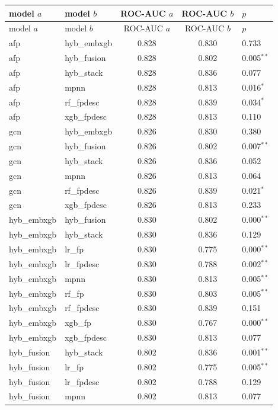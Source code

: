 \documentclass[conference]{IEEEtran}
\begin{document}
\begin{longtable}{llccl}
\toprule
model $a$ & model $b$ & ROC-AUC $a$ & ROC-AUC $b$ & $p$ \\
\midrule
\endfirsthead
\toprule
model $a$ & model $b$ & ROC-AUC $a$ & ROC-AUC $b$ & $p$ \\
\midrule
\endhead
\bottomrule
\endfoot
afp & hyb\_embxgb & 0.828 & 0.830 & 0.733 \\
afp & hyb\_fusion & 0.828 & 0.802 & 0.005$^{**}$ \\
afp & hyb\_stack & 0.828 & 0.836 & 0.077 \\
afp & mpnn & 0.828 & 0.813 & 0.016$^{*}$ \\
afp & rf\_fpdesc & 0.828 & 0.839 & 0.034$^{*}$ \\
afp & xgb\_fpdesc & 0.828 & 0.813 & 0.110 \\
gcn & hyb\_embxgb & 0.826 & 0.830 & 0.380 \\
gcn & hyb\_fusion & 0.826 & 0.802 & 0.007$^{**}$ \\
gcn & hyb\_stack & 0.826 & 0.836 & 0.052 \\
gcn & mpnn & 0.826 & 0.813 & 0.064 \\
gcn & rf\_fpdesc & 0.826 & 0.839 & 0.021$^{*}$ \\
gcn & xgb\_fpdesc & 0.826 & 0.813 & 0.233 \\
hyb\_embxgb & hyb\_fusion & 0.830 & 0.802 & 0.000$^{**}$ \\
hyb\_embxgb & hyb\_stack & 0.830 & 0.836 & 0.129 \\
hyb\_embxgb & lr\_fp & 0.830 & 0.775 & 0.000$^{**}$ \\
hyb\_embxgb & lr\_fpdesc & 0.830 & 0.788 & 0.002$^{**}$ \\
hyb\_embxgb & mpnn & 0.830 & 0.813 & 0.005$^{**}$ \\
hyb\_embxgb & rf\_fp & 0.830 & 0.803 & 0.005$^{**}$ \\
hyb\_embxgb & rf\_fpdesc & 0.830 & 0.839 & 0.151 \\
hyb\_embxgb & xgb\_fp & 0.830 & 0.767 & 0.000$^{**}$ \\
hyb\_embxgb & xgb\_fpdesc & 0.830 & 0.813 & 0.077 \\
hyb\_fusion & hyb\_stack & 0.802 & 0.836 & 0.001$^{**}$ \\
hyb\_fusion & lr\_fp & 0.802 & 0.775 & 0.005$^{**}$ \\
hyb\_fusion & lr\_fpdesc & 0.802 & 0.788 & 0.129 \\
hyb\_fusion & mpnn & 0.802 & 0.813 & 0.077 \\

\end{longtable}
\end{document}
